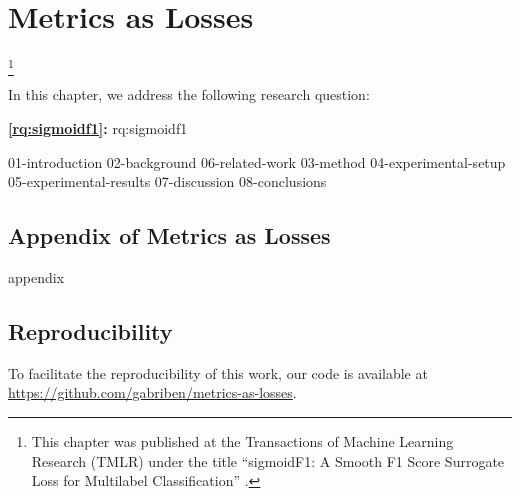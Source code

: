 
\chapter{Metrics as Losses}
\label{chapter:research-sigmoidf1}

\footnote[]{This chapter was published at the Transactions of Machine Learning Research (TMLR) under the title ``sigmoidF1: A Smooth F1 Score Surrogate Loss for Multilabel Classification'' \citep{sigmoidf1}.}
\acresetall

In this chapter, we address the following research question:

\medskip
\noindent
\textbf{\ref{rq:sigmoidf1}:} \acl{rq:sigmoidf1}
\medskip

\noindent

{01-introduction}
{02-background}
{06-related-work}
{03-method}
{04-experimental-setup}
{05-experimental-results}
{07-discussion}
{08-conclusions}

\begin{appendices}
\chapter{Appendix of Metrics as Losses}
{appendix}
\end{appendices}

\section*{Reproducibility}
To facilitate the reproducibility of this work, our code is available at \url{https://github.com/gabriben/metrics-as-losses}.






